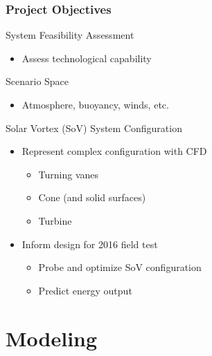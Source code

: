 \documentclass[mathserif]{beamer}
\begin{document}
%
%
%
\begin{frame}
\frametitle{Project Objectives}

 \begin{block}{System Feasibility Assessment}
  \begin{itemize}
   \item Assess technological capability
  \end{itemize}
 \end{block}


 \begin{block}{Scenario Space}
  \begin{itemize}
   \item Atmosphere, buoyancy, winds, etc. 
  \end{itemize}
  \end{block}

 \begin{block}{Solar Vortex (SoV) System Configuration}
 \begin{itemize}
  \item Represent complex configuration with CFD
	\begin{itemize}
	 \item Turning vanes
	 \item Cone (and solid surfaces)
	 \item Turbine
	\end{itemize}
  \item Inform design for 2016 field test
	\begin{itemize}
	 \item Probe and optimize SoV configuration
	 \item Predict energy output
	\end{itemize}
 \end{itemize}
 \end{block}

\end{frame}



\section{Modeling}
%
%
\end{document}
